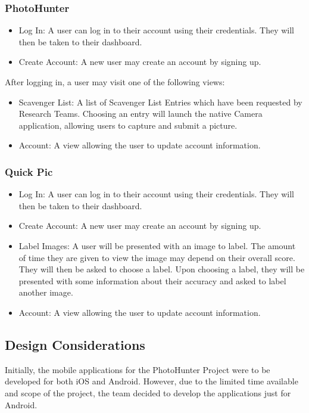 \documentclass{article}
\begin{document}
\subsubsection{PhotoHunter}

\begin{itemize}
  \item Log In: A user can log in to their account using their credentials.
        They will then be taken to their dashboard.
  \item Create Account: A new user may create an account by signing up.
\end{itemize}

After logging in, a user may visit one of the following views:

\begin{itemize}
  \item Scavenger List: A list of Scavenger List Entries which have been
        requested by Research Teams. Choosing an entry will launch the native Camera
        application, allowing users to capture and submit a picture.
  \item Account: A view allowing the user to update account information.
\end{itemize}

\subsubsection{Quick Pic}

\begin{itemize}
  \item Log In: A user can log in to their account using their credentials. They will then be taken to their dashboard.
  \item Create Account: A new user may create an account by signing up.
\end{itemize}

\begin{itemize}
  \item Label Images: A user will be presented with an image to label.  The
    amount of time they are given to view the image may depend on their overall
    score.  They will then be asked to choose a label.  Upon choosing a label,
    they will be presented with some information about their accuracy and asked
    to label another image.
  \item Account: A view allowing the user to update account information.
\end{itemize}
\subsection{Design Considerations}
Initially, the mobile applications for the PhotoHunter Project were to be
developed for both iOS and Android. However, due to the limited time available
and scope of the project, the team decided to develop the applications just for
Android. 
\end{document}
